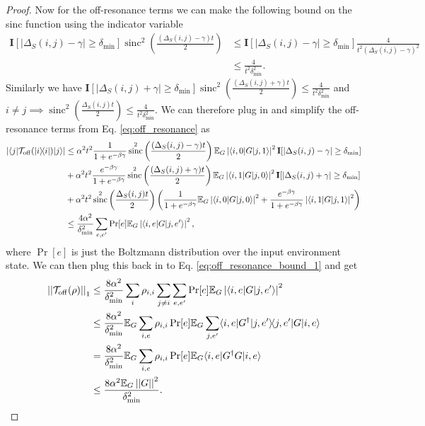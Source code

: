 \documentclass[
 amsmath,amssymb,
 aps,
onecolumn, 
nofootinbib]{revtex4-2}
\newcommand{\ket}[1]{|#1\rangle}
\newcommand{\bra}[1]{\langle #1|}
\newcommand{\ketbra}[2]{| #1\rangle\! \langle #2|}
\newcommand{\abs}[1]{\left| #1 \right|}
\newcommand{\norm}[1]{\left|\left| #1 \right|\right|}
\newcommand{\EE}{\mathbb{E}}
\DeclareMathOperator{\sinc}{sinc}
\begin{document}
\begin{proof}
    Now for the off-resonance terms we can make the following bound on the sinc function using the indicator variable 
    \begin{align}
        \mathbf{I}[\abs{\Delta_S (i,j) - \gamma } \ge \delta_{\min}] \sinc^2\left(\frac{(\Delta_S (i,j) - \gamma) t}{2}\right) &\le \mathbf{I}[\abs{\Delta_S (i,j) - \gamma } \ge \delta_{\min}] \frac{4}{t^2 (\Delta_S(i,j) - \gamma)^2} \\
        &\le \frac{4}{t^2 \delta_{\min}^2}.
    \end{align}
    Similarly we have $\mathbf{I}[\abs{\Delta_S(i,j) + \gamma} \ge \delta_{\min}] \sinc^2 \left(\frac{(\Delta_S(i,j) + \gamma) t}{2} \right) \le \frac{4}{t^2 \delta_{\min}^2}$ and $i \neq j \implies \sinc^2\left( \frac{\Delta_S(i,j) t}{2} \right) \le \frac{4}{t^2 \delta_{\min}^2}$. We can therefore plug in and simplify the off-resonance terms from Eq. \ref{eq:off_resonance} as
    \begin{align}
        \abs{\bra{j}\mathcal{T}_{\rm off}(\ketbra{i}{i}) \ket{j}} &\le \alpha^2 t^2 \frac{1}{1 + e^{-\beta \gamma}} \sinc^2 \left( \frac{(\Delta_S(i,j) - \gamma) t}{2}\right) \EE_G \abs{\bra{i,0} G \ket{j, 1}}^2 \mathbf{I}[|\Delta_S (i,j) - \gamma | \ge \delta_{\min}] \nonumber \\ 
        &+ \alpha^2 t^2 \frac{e^{-\beta \gamma}}{1 + e^{-\beta \gamma}} \sinc^2 \left( \frac{(\Delta_S(i,j) + \gamma) t}{2}\right) \EE_G \abs{\bra{i,1} G \ket{j, 0}}^2 \mathbf{I}[|\Delta_S (i,j) + \gamma | \ge \delta_{\min}] \nonumber \\ 
        &+ \alpha^2 t^2 \sinc^2 \left( \frac{\Delta_S (i,j) t}{2} \right) \left(\frac{1}{1+ e^{-\beta \gamma}} \EE_G \abs{\bra{i,0} G \ket{j,0}}^2 + \frac{e^{-\beta \gamma}}{1 + e^{-\beta \gamma}} \abs{\bra{i,1} G \ket{j,1}}^2 \right) \nonumber \\
        &\le \frac{4 \alpha^2}{\delta_{\min}^2} \sum_{e, e'} \Pr[e] \EE_G \abs{\bra{i, e} G \ket{j, e'}}^2,
    \end{align}
    where $\Pr[e]$ is just the Boltzmann distribution over the input environment state. We can then plug this back in to Eq. \eqref{eq:off_resonance_bound_1} and get
    \begin{align}
        \norm{\mathcal{T}_{\rm off}(\rho)}_1 &\le \frac{8 \alpha^2}{\delta_{\min}^2} \sum_{i} \rho_{i, i} \sum_{j \neq i} \sum_{e, e'} \Pr[e] \EE_G \abs{\bra{i,e} G \ket{j, e'}}^2 \\
        &\le \frac{8 \alpha^2}{\delta_{\min}^2} \EE_G \sum_{i, e} \rho_{i, i} \Pr[e] \EE_G \sum_{j, e'} \bra{i, e} G^\dagger \ketbra{j, e'}{j,e'} G \ket{i,e} \\
        &= \frac{8 \alpha^2}{\delta_{\min}^2} \EE_G \sum_{i, e} \rho_{i, i} \Pr[e] \EE_G \bra{i, e} G^\dagger G \ket{i,e} \\
        &\le \frac{8 \alpha^2 \EE_G\norm{G}^2}{\delta_{\min}^2}.
    \end{align}
\end{proof}
\end{document}

